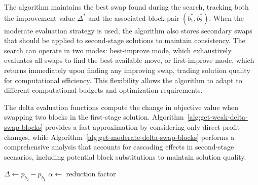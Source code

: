 The algorithm maintains the best swap found during the search, tracking both the improvement value $\Delta^*$ and the associated block pair $(b_1^*, b_2^*)$. When the moderate evaluation strategy is used, the algorithm also stores secondary swaps that should be applied to second-stage solutions to maintain consistency. The search can operate in two modes: best-improve mode, which exhaustively evaluates all swaps to find the best available move, or first-improve mode, which returns immediately upon finding any improving swap, trading solution quality for computational efficiency. This flexibility allows the algorithm to adapt to different computational budgets and optimization requirements.

The delta evaluation functions compute the change in objective value when swapping two blocks in the first-stage solution. Algorithm~\ref{alg:get-weak-delta-swap-blocks} provides a fast approximation by considering only direct profit changes, while Algorithm~\ref{alg:get-moderate-delta-swap-blocks} performs a comprehensive analysis that accounts for cascading effects in second-stage scenarios, including potential block substitutions to maintain solution quality.

\begin{algorithm}[h!]
	\caption{Get Weak Delta Swap Blocks} \label{alg:get-weak-delta-swap-blocks}
	\SetAlgoLined

	$\Delta \leftarrow p_{b_2} - p_{b_1}$\;
	$\alpha \leftarrow$ reduction factor\;

	\Return{$\Delta$}\;
\end{algorithm}

